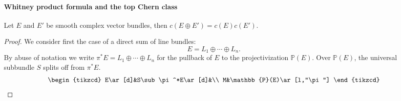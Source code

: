 \paragraph{Whitney product formula and the top Chern class}
\begin{proposition}
Let $E$ and $E'$ be smooth complex vector bundles, then $c(E\oplus E')=c(E)c(E')$.
\end{proposition}
\begin{proof}
We consider first the case of a direct sum of line bundles:
\[E=L_1\oplus\cdots\oplus L_n.\]
By abuse of notation we write $\pi^*E=L_1\oplus\cdots\oplus L_n$ for the pullback of $E$ to the projectivization $\mathbb{P}(E)$. Over $\mathbb{P}(E)$, the universal 
subbundle $S$ splits off from $\pi^*E$.
\[\begin{tikzcd}
E\ar[d]&S\sub\pi^*E\ar[d]&\\
M&\mathbb{P}(E)\ar[l,"\pi"]
\end{tikzcd}\]


\end{proof}
